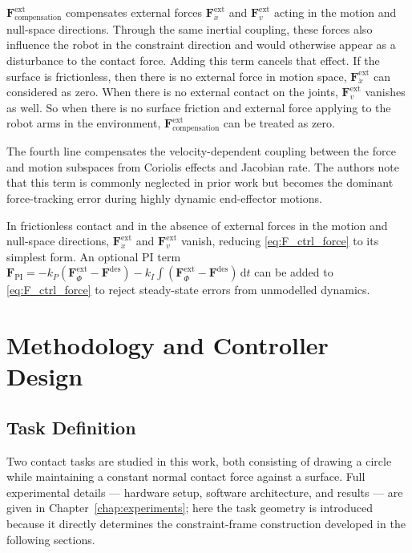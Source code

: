\documentclass[
	german,%
	accentcolor=9c,%
	ruledheaders=section,%
	class=report,%
	thesis={type=bachelor},%
	fontsize=11pt,%
	parskip=half-,%
	custommargins=true,%
	marginpar=false,%
]{tudapub}
\begin{document}
$\mathbf{F}^{\text{ext}}_{\text{compensation}}$ compensates external forces $\mathbf{F}^{\text{ext}}_{\dot{x}}$
and $\mathbf{F}^{\text{ext}}_{v}$ acting in the motion and null-space
directions. Through the same inertial coupling, these forces also influence
the robot in the constraint direction and would otherwise appear as a
disturbance to the contact force. Adding this term cancels that effect. If the surface is frictionless, then there is no external force in motion space, $\mathbf{F}^{\text{ext}}_{\dot{x}}$ can considered as zero. When there is no external contact on the joints, $\mathbf{F}^{\text{ext}}_{v}$ vanishes as well. So when there is no surface friction and external force applying to the robot arms in the environment, $\mathbf{F}^{\text{ext}}_{\text{compensation}}$ can be treated as zero.


The fourth line compensates the velocity-dependent coupling between the
force and motion subspaces from Coriolis effects and Jacobian rate.
The authors note that this term is commonly neglected in prior work but
becomes the dominant force-tracking error during highly dynamic end-effector
motions. 

In frictionless contact and in the absence of external forces in the motion
and null-space directions, $\mathbf{F}^{\text{ext}}_{\dot{x}}$ and
$\mathbf{F}^{\text{ext}}_{v}$ vanish, reducing \eqref{eq:F_ctrl_force} to
its simplest form.
An optional PI term
$\mathbf{F}_{\text{PI}} = -k_{P}(\mathbf{F}^{\text{ext}}_{\dot{\Phi}} -
\mathbf{F}^{\text{des}}) - k_{I}\int(\mathbf{F}^{\text{ext}}_{\dot{\Phi}}
- \mathbf{F}^{\text{des}})\,\mathrm{d}t$
can be added to \eqref{eq:F_ctrl_force} to reject steady-state errors from
unmodelled dynamics.


\chapter{Methodology and Controller Design}
\label{chap:methodology}

\section{Task Definition}
\label{sec:task_definition}

Two contact tasks are studied in this work, both consisting of drawing a
circle while maintaining a constant normal contact force against a surface.
Full experimental details — hardware setup, software architecture, and
results — are given in Chapter~\ref{chap:experiments}; here the task geometry
is introduced because it directly determines the constraint-frame construction
developed in the following sections.
\end{document}

